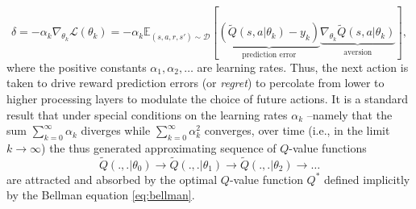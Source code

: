 \documentclass[10pt,letterpaper]{article}
\begin{document}
\begin{equation}
  \delta= -\alpha_k \nabla_{\theta_{k}}\mathcal L(\theta_{k})
  = -\alpha_k\mathbb E_{(s, a, r, s') \sim \mathcal D}[\underbrace{(\tilde{Q}(s, a|\theta_{k}) - y_k)}_{\text{prediction error}}
    \underbrace{\nabla_{\theta_{k}}\tilde{Q}(s, a|\theta_{k})}_{\text{aversion}}],
  \label{eq:oracle}
\end{equation}
where the positive constants $\alpha_1, \alpha_2,\ldots$ are learning rates.
Thus, the next action is taken to drive reward prediction errors
(or \textit{regret}) to percolate from lower to higher processing layers to modulate the
choice of future actions. It is a standard result that under special conditions on the learning rates $\alpha_k$
--namely that the sum $\sum_{k=0}^\infty\alpha_k$
diverges while $\sum_{k=0}^\infty\alpha_k^2$ converges, over time (i.e., in the limit $k \rightarrow \infty$)
the thus generated approximating sequence of $Q$-value functions
$$\tilde{Q}(.,.|\theta_0) \rightarrow \tilde{Q}(.,.|\theta_1) \rightarrow \tilde{Q}(.,.|\theta_2) \rightarrow \ldots$$
are attracted and absorbed by the optimal $Q$-value function $Q^*$ defined implicitly by the Bellman equation \eqref{eq:bellman}.

\end{document}
